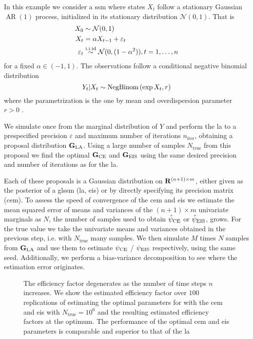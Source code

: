 \begin{example}
    \label{ex:negbinom-ar1}
    In this example we consider a \gls{ssm} where states $X_{t}$ follow a stationary Gaussian $\operatorname{AR}(1)$ process, initialized in its stationary distribution $\mathcal N(0,1)$. That is
    \begin{align*}
    X_{0} &\sim \mathcal N(0,1) \\
    X_{t} &= \alpha X_{t - 1} + \varepsilon_{t}\\
    \varepsilon_t &\stackrel{\text{i.i.id}}{\sim} \mathcal N(0, (1 - \alpha^{2})), t = 1, \dots, n
    \end{align*}
    for a fixed $\alpha \in (-1,1)$. The observations follow a conditional negative binomial distribution 
    $$
    Y_{t} | X_{t} \sim \operatorname{NegBinom} \left( \exp{X_{t}}, r \right)
    $$
    where the parametrization is the one by mean and overdispersion parameter $r > 0$ .

    We simulate once from the marginal distribution of $Y$ and perform the \gls{la} to a prespecified precision $\varepsilon$ and maximum number of iterations $n_{\text{iter}}$, obtaining a proposal distribution $\mathbf G_{{\text{LA}}}$. Using a large number of samples $N_{\text{true}}$ from this proposal we find the optimal $\mathbf G_{{\text{CE}}}$ and $\mathbf G_{{\text{EIS}}}$ using the same desired precision and number of iterations as for the \gls{la}. 

    Each of these proposals is a Gaussian distribution on $\mathbf R^{(n+1)\times m}$, either given as the posterior of a \gls{glssm} (\gls{la}, \gls{eis}) or by directly specifying its precision matrix (\gls{cem}). 
    To assess the speed of convergence of the \gls{cem} and \gls{eis} we estimate the mean squared error of means and variances of the $(n+1) \times m$ univariate marginals as $N$, the number of samples used to obtain ${\hat\psi_{\text{CE}}}$ or ${\hat\psi_{\text{EIS}}}$, grows. For the true value we take the univariate means and variances obtained in the previous step, i.e. with $N_{\text{true}}$ many samples. 
    We then simulate $M$ times $N$ samples from $\mathbf G_{{\text{LA}}}$ and use them to estimate ${\psi_{\text{CE}}}$ / ${\psi_{\text{EIS}}}$ respectively, using the same seed. 
    Additionally, we perform a bias-variance decomposition to see where the estimation error originates. 

    \begin{figure}
            \resizebox{\textwidth}{!}{%
            }
        \caption{The efficiency factor degenerates as the number of time steps $n$ increases. We show the estimated efficiency factor over $100$ replications of estimating the optimal parameters for  with the \gls{cem} and \gls{eis} with $N_{\text{true}} = 10^{6}$ and the resulting estimated efficiency factors at the optimum. The performance of the optimal \gls{cem} and \gls{eis} parameters is comparable and superior to that of the \gls{la}}
    \end{figure}


\end{example}

